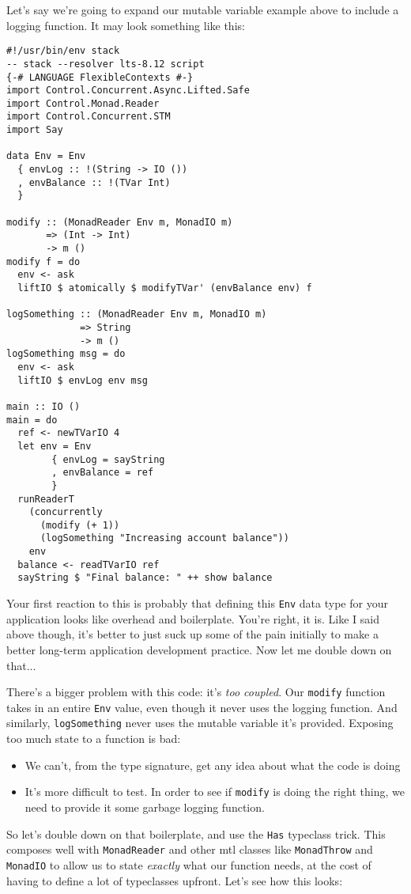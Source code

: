 Let's say we're going to expand our mutable variable example above to
include a logging function. It may look something like this:

\begin{verbatim}
#!/usr/bin/env stack
-- stack --resolver lts-8.12 script
{-# LANGUAGE FlexibleContexts #-}
import Control.Concurrent.Async.Lifted.Safe
import Control.Monad.Reader
import Control.Concurrent.STM
import Say

data Env = Env
  { envLog :: !(String -> IO ())
  , envBalance :: !(TVar Int)
  }

modify :: (MonadReader Env m, MonadIO m)
       => (Int -> Int)
       -> m ()
modify f = do
  env <- ask
  liftIO $ atomically $ modifyTVar' (envBalance env) f

logSomething :: (MonadReader Env m, MonadIO m)
             => String
             -> m ()
logSomething msg = do
  env <- ask
  liftIO $ envLog env msg

main :: IO ()
main = do
  ref <- newTVarIO 4
  let env = Env
        { envLog = sayString
        , envBalance = ref
        }
  runReaderT
    (concurrently
      (modify (+ 1))
      (logSomething "Increasing account balance"))
    env
  balance <- readTVarIO ref
  sayString $ "Final balance: " ++ show balance
\end{verbatim}
Your first reaction to this is probably that defining this \texttt{Env}
data type for your application looks like overhead and boilerplate.
You're right, it is. Like I said above though, it's better to just suck
up some of the pain initially to make a better long-term application
development practice. Now let me double down on that...

There's a bigger problem with this code: it's \emph{too coupled}. Our
\texttt{modify} function takes in an entire \texttt{Env} value, even
though it never uses the logging function. And similarly,
\texttt{logSomething} never uses the mutable variable it's provided.
Exposing too much state to a function is bad:

\begin{itemize}

\item
  We can't, from the type signature, get any idea about what the code is
  doing
\item
  It's more difficult to test. In order to see if \texttt{modify} is
  doing the right thing, we need to provide it some garbage logging
  function.
\end{itemize}
So let's double down on that boilerplate, and use the \texttt{Has}
typeclass trick. This composes well with \texttt{MonadReader} and other
mtl classes like \texttt{MonadThrow} and \texttt{MonadIO} to allow us to
state \emph{exactly} what our function needs, at the cost of having to
define a lot of typeclasses upfront. Let's see how this looks:

